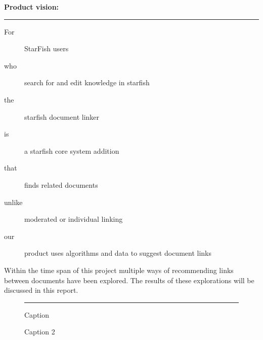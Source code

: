 \begin{shaded}
\textbf{{\large Product vision:}} \vspace{0.5\baselineskip} \hrule
	\begin{description}
 		\item[For] StarFish users
 		\item[who] search for and edit knowledge in starfish
 		\item[the] starfish document linker 
 		\item[is] a starfish core system addition
 		\item[that] finds related documents
 		\item[unlike] moderated or individual linking
 		\item[our] product uses algorithms and data to suggest document links 
	\end{description}
\end{shaded}


Within the time span of this project multiple ways of recommending links between documents have been explored. The results of these explorations will be discussed in this report. 

\begin{figure}
\hhrule \vspace{0.5\baselineskip}
\null\hfill\parbox[b]{0.45\linewidth}{%
\centering
\def\svgwidth{\linewidth}
}\hfill
\parbox[b]{0.45\linewidth}{%
\centering
\def\svgwidth{\linewidth}
}\hfill\null
\vspace{0.5\baselineskip}\hrule
\null\hfill\parbox[t]{0.45\linewidth}{%
\caption[Short Caption]{Caption}
\label{fig:motn}
}\hfill
\parbox[t]{0.45\linewidth}{%
\caption[Short Caption]{Caption 2} 
\label{fig:batman}
}\hfill\null
\hhrule
\end{figure}
